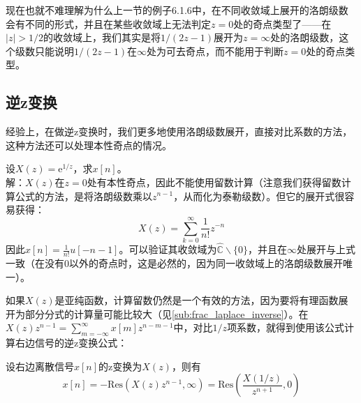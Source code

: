 现在也就不难理解为什么上一节的例子6.1.6中，在不同收敛域上展开的洛朗级数会有不同的形式，并且在某些收敛域上无法判定$z=0$处的奇点类型了——在$|z|>1/2$的收敛域上，我们其实是将$1/(2z-1)$展开为$z=\infty$处的洛朗级数，这个级数只能说明$1/(2z-1)$在$\infty$处为可去奇点，而不能用于判断$z=0$处的奇点类型。

\subsection{逆z变换}\label{sub:z_inverse}
经验上，在做逆z变换时，我们更多地使用洛朗级数展开，直接对比系数的方法，这种方法还可以处理本性奇点的情况。
\begin{example}
    设$X(z)=\mathrm{e}^{1/z}$，求$x[n]$。\\
    解：$X(z)$在$z=0$处有本性奇点，因此不能使用留数计算（注意我们获得留数计算公式的方法，是将洛朗级数乘以$z^{n-1}$，从而化为泰勒级数）。但它的展开式很容易获得：
    \[X(z)=\sum_{k=0}^{\infty}\frac{1}{n!}z^{-n}\]
    因此$x[n]=\frac{1}{n!}u[-n-1]$。可以验证其收敛域为$\hat{\mathbb{C}}\backslash\{0\}$，并且在$\infty$处展开与上式一致（在没有$0$以外的奇点时，这是必然的，因为同一收敛域上的洛朗级数展开唯一）。
\end{example}

如果$X(z)$是亚纯函数，计算留数仍然是一个有效的方法，因为要将有理函数展开为部分分式的计算量可能比较大（见\ref{sub:frac_laplace_inverse}）。在$X(z)z^{n-1}=\sum_{m=-\infty}^{\infty}x[m]z^{n-m-1}$中，对比$1/z$项系数，就得到使用该公式计算右边信号的逆z变换公式：
\begin{theorem}
    设右边离散信号$x[n]$的z变换为$X(z)$，则有
    \[x[n]=-\mathrm{Res}\left(X(z)z^{n-1},\infty\right)=\mathrm{Res}\left(\frac{X(1/z)}{z^{n+1}},0\right)\]
\end{theorem}

